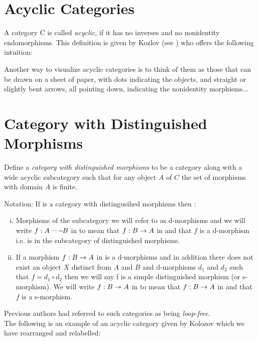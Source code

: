 \documentclass[10pt,a4paper]{scrartcl}
\begin{document}
\section {Acyclic Categories}
A category C is called \textit{acyclic}, if it has no inverses and no nonidentity
endomorphisms. This definition is given by Kozlov (see \cite{Kozlov2007}) who offers the following intuition:
\begin{erquote}
Another way to visualize acyclic categories is to think of them as those
that can be drawn on a sheet of paper, with dots indicating the objects, and
straight or slightly bent arrows, all pointing down, indicating the nonidentity
morphisms...
\end{erquote}

\section{Category with Distinguished Morphisms}

\begin{definition}
Define a \textit{category with distinguished morphisms} to be a category  along with a wide acyclic subcategory  such that for any object $A$ of $C$ the set of morphisms with domain $A$ is finite.
\end{definition} 

\noindent
Notation:
If  is a category with distingusihed morphisms then :
\begin{enumerate}[(i)]
\item Morphisms of the subcategory we will refer to as d-morphisms and we will write  
$f: A \dmorph B$ in 
to mean that 
$f: B \rightarrow A$ in  and that $f$ is a d-morphism i.e. is in the subcategory  of distinguished morphisms. 
\item If a morphism $f: B \rightarrow A$ in  is a d-morphisms and in addition
there does not exist an object $X$ distinct from $A$ and $B$ and d-morphisms $d_1$ and $d_2$
such that $f=d_1 \circ d_2$ then we will say f is a simple distinguished morphism (or s-morphism). We will write  $f:B \rightarrowtriangle A$ in 
to mean that 
$f: B \rightarrow A$ in  and that $f$ is a s-morphism.
\end{enumerate}

\noindent
Previous authors had referred to such categories as being \textit{loop-free}. \\

\noindent
The following is an example of an acyclic category given by Kolozov which we have rearranged and relabelled:
\end{document}
